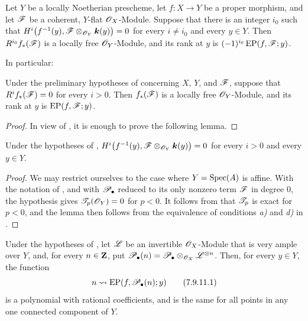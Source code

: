 \begin{corollary}[7.9.9]
\label{III.7.9.9}
Let $Y$ be a locally Noetherian prescheme, let
$f:X\to Y$ be a proper morphism, and let $\mathscr{F}$ be a
coherent, $Y$-flat $\mathscr{O}_X$-Module.  Suppose that there
is an integer $i_0$ such that $H^i\bigl(f^{-1}(y),
\mathscr{F}\otimes_{\mathscr{O}_Y}\boldsymbol{k}(y)\bigr)=0$
for every $i\neq i_0$ and every $y\in Y$.  Then
$R^{i_0}f_*(\mathscr{F})$ is a locally free
$\mathscr{O}_Y$-Module, and its rank at $y$ is
$(- 1)^{i_0}\operatorname{EP}(f,\mathscr{F};y)$.
\end{corollary}

In particular:

\begin{corollary}[7.9.10]
\label{III.7.9.10}
Under the preliminary hypotheses of 
concerning $X$, $Y$, and $\mathscr{F}$, suppose that
$R^if_*(\mathscr{F})=0$ for every $i>0$.  Then
$f_*(\mathscr{F})$ is a locally free $\mathscr{O}_Y$-Module, and its
rank at $y$ is $\operatorname{EP}(f,\mathscr{F};y)$.
\end{corollary}

\begin{proof}
In view of , it is enough to prove the
following lemma.
\end{proof}

\begin{lemma}[7.9.10.1]
\label{III.7.9.10.1}
Under the hypotheses of , $H^i\bigl(f^{-1}(y),
\mathscr{F}\otimes_{\mathscr{O}_Y}\boldsymbol{k}(y)\bigr)=0$
for every $i>0$ and every $y\in Y$.
\end{lemma}

\begin{proof}
We may restrict ourselves to the case where
$Y=\operatorname{Spec}(A)$ is affine.  With the notation of
, and with $\mathscr{P}_\bullet$ reduced to its
only nonzero term $\mathscr{F}$ in degree $0$, the hypothesis
gives $\mathscr{T}_p(\mathscr{O}_Y)=0$ for $p<0$.  It follows from
 that $\mathscr{T}_p$ is exact for $p<0$, and
the lemma then follows from the equivalence of conditions
\emph{a)} and \emph{d)} in .
\end{proof}

\begin{proposition}[7.9.11]
\label{III.7.9.11}
Under the hypotheses of , let $\mathscr{L}$ be
an invertible $\mathscr{O}_X$-Module that is very ample over
$Y$, and, for every $n\in\mathbf{Z}$, put $\mathscr{P}_\bullet(n)
=
\mathscr{P}_\bullet
\otimes_{\mathscr{O}_X}\mathscr{L}^{\otimes n}$.
Then, for every $y\in Y$, the function
\[
  n\leadsto
  \operatorname{EP}(f,\mathscr{P}_\bullet(n);y)
  \tag{7.9.11.1}\label{III.7.9.11.1}
\]
is a polynomial with rational coefficients, and is the
same for all points in any one connected component of
$Y$.
\end{proposition}

